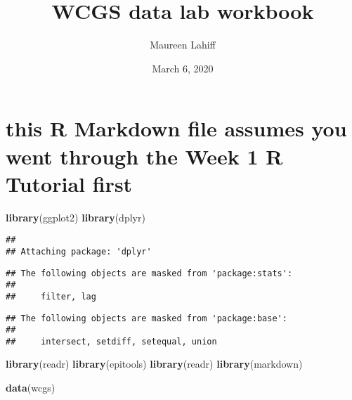 \documentclass[]{article}
\title{WCGS data lab workbook}
\author{Maureen Lahiff}
\date{March 6, 2020}
\newenvironment{Shaded}{\begin{snugshade}}{\end{snugshade}}
\newcommand{\KeywordTok}[1]{\textcolor[rgb]{0.13,0.29,0.53}{\textbf{#1}}}
\newcommand{\NormalTok}[1]{#1}
\begin{document}
\maketitle

\hypertarget{this-r-markdown-file-assumes-you-went-through-the-week-1-r-tutorial-first}{%
\section{this R Markdown file assumes you went through the Week 1 R
Tutorial
first}\label{this-r-markdown-file-assumes-you-went-through-the-week-1-r-tutorial-first}}

\begin{Shaded}
\begin{Highlighting}[]
\KeywordTok{library}\NormalTok{(ggplot2)}
\KeywordTok{library}\NormalTok{(dplyr)}
\end{Highlighting}
\end{Shaded}

\begin{verbatim}
## 
## Attaching package: 'dplyr'
\end{verbatim}

\begin{verbatim}
## The following objects are masked from 'package:stats':
## 
##     filter, lag
\end{verbatim}

\begin{verbatim}
## The following objects are masked from 'package:base':
## 
##     intersect, setdiff, setequal, union
\end{verbatim}

\begin{Shaded}
\begin{Highlighting}[]
\KeywordTok{library}\NormalTok{(readr)}
\KeywordTok{library}\NormalTok{(epitools)}
\KeywordTok{library}\NormalTok{(readr)}
\KeywordTok{library}\NormalTok{(markdown)}

\KeywordTok{data}\NormalTok{(wcgs)}
\end{Highlighting}
\end{Shaded}
\end{document}
